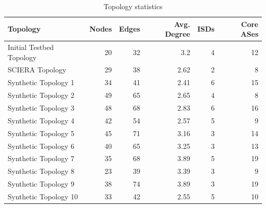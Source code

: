 \begin{table}[h]
    \centering
    \begin{tabular}{lrrrrr}
        \toprule
        Topology & Nodes & Edges & Avg. Degree & ISDs & Core ASes \\
        \midrule
        Initial Testbed Topology & 20 & 32 & 3.2 & 4 & 12 \\
        SCIERA Topology & 29 & 38 & 2.62 & 2 & 8 \\
        Synthetic Topology 1 & 34 & 41 & 2.41 & 6 & 15 \\
        Synthetic Topology 2 & 49 & 65 & 2.65 & 4 & 8 \\
        Synthetic Topology 3 & 48 & 68 & 2.83 & 6 & 16 \\
        Synthetic Topology 4 & 42 & 54 & 2.57 & 5 & 9 \\
        Synthetic Topology 5 & 45 & 71 & 3.16 & 3 & 14 \\
        Synthetic Topology 6 & 40 & 65 & 3.25 & 3 & 13 \\
        Synthetic Topology 7 & 35 & 68 & 3.89 & 5 & 19 \\
        Synthetic Topology 8 & 23 & 39 & 3.39 & 3 & 9 \\
        Synthetic Topology 9 & 38 & 74 & 3.89 & 3 & 19 \\
        Synthetic Topology 10 & 33 & 42 & 2.55 & 5 & 10 \\
        \bottomrule
    \end{tabular}
    \caption{Topology statistics}
    \label{tab:topology_stats}
\end{table}